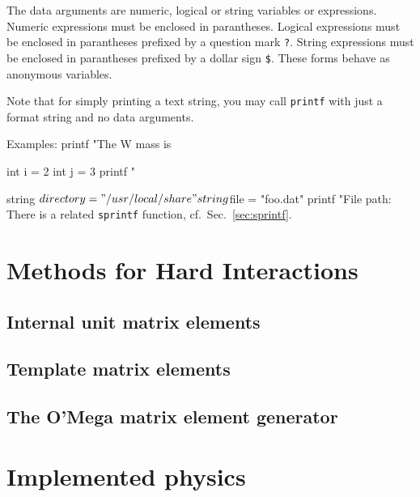 \documentclass[12pt]{book}
\newenvironment{code}%
  {\begingroup\footnotesize
   \quote
   \verbatim}%
  {\endverbatim
   \endquote
   \endgroup\noindent}
\newcommand{\ttt}[1]{\texttt{#1}}
\begin{document}
The data arguments are numeric, logical or string variables or expressions.
Numeric expressions must be enclosed in parantheses.  Logical expressions must
be enclosed in parantheses prefixed by a question mark \verb|?|.  String
expressions must be enclosed in parantheses prefixed by a dollar sign
\verb|$|.  These forms behave as anonymous variables.

Note that for simply printing a text string, you may call \ttt{printf} with
just a format string and no data arguments.

Examples:
\begin{code}
printf "The W mass is %

int i = 2
int j = 3
printf "%

string $directory = "/usr/local/share"
string $file = "foo.dat"
printf "File path: %
\end{code}
There is a related \ttt{sprintf} function, cf.~Sec.~\ref{sec:sprintf}.



\chapter{Methods for Hard Interactions}
\label{chap:hardint}

\section{Internal unit matrix elements}
\label{sec:unit_me}


\section{Template matrix elements}
\label{sec:template_me}


\section{The O'Mega matrix element generator}
\label{sec:omega_me}

\newpage

\chapter{Implemented physics}
\label{chap:physics}
\end{document}
